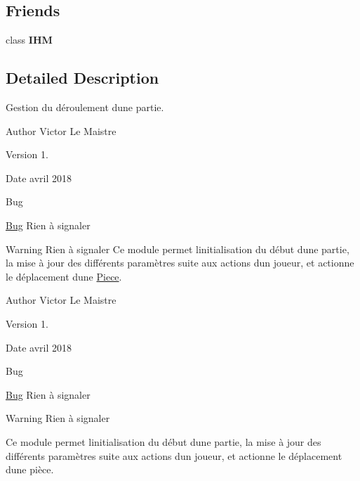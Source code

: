 \subsection*{Friends}
\begin{DoxyCompactItemize}
\item 
\mbox{\label{classJeu_a7f86a545eeed146d5e1f900eded41bc2}} 
class {\bfseries I\+HM}
\end{DoxyCompactItemize}


\subsection{Detailed Description}
Gestion du déroulement d\textquotesingle{}une partie. 

\begin{DoxyAuthor}{Author}
Victor Le Maistre 
\end{DoxyAuthor}
\begin{DoxyVersion}{Version}
1. 
\end{DoxyVersion}
\begin{DoxyDate}{Date}
avril 2018 
\end{DoxyDate}
\begin{DoxyRefDesc}{Bug}
\item[\hyperlink{bug__bug000004}{Bug}]Rien à signaler \end{DoxyRefDesc}
\begin{DoxyWarning}{Warning}
Rien à signaler Ce module permet l\textquotesingle{}initialisation du début d\textquotesingle{}une partie, la mise à jour des différents paramètres suite aux actions d\textquotesingle{}un joueur, et actionne le déplacement d\textquotesingle{}une \hyperlink{classPiece}{Piece}.
\end{DoxyWarning}
\begin{DoxyAuthor}{Author}
Victor Le Maistre 
\end{DoxyAuthor}
\begin{DoxyVersion}{Version}
1. 
\end{DoxyVersion}
\begin{DoxyDate}{Date}
avril 2018 
\end{DoxyDate}
\begin{DoxyRefDesc}{Bug}
\item[\hyperlink{bug__bug000005}{Bug}]Rien à signaler \end{DoxyRefDesc}
\begin{DoxyWarning}{Warning}
Rien à signaler
\end{DoxyWarning}
Ce module permet l\textquotesingle{}initialisation du début d\textquotesingle{}une partie, la mise à jour des différents paramètres suite aux actions d\textquotesingle{}un joueur, et actionne le déplacement d\textquotesingle{}une pièce.

